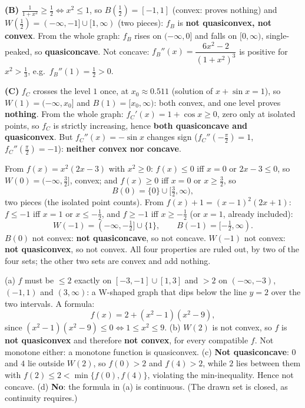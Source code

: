 \begin{solutions}
        \textbf{(B)} $\tfrac{1}{1+x^{2}}\ge\tfrac12\iff x^{2}\le1$, so
        $B(\tfrac12)=[-1,1]$ (convex: proves nothing) and
        $W(\tfrac12)=(-\infty,-1]\cup[1,\infty)$ (two pieces): $f_B$ is
        \textbf{not quasiconvex, not convex}. From the whole graph: $f_B$
        rises on $(-\infty,0]$ and falls on $[0,\infty)$, single-peaked,
        so \textbf{quasiconcave}. Not concave:
        $f_B''(x)=\dfrac{6x^{2}-2}{(1+x^{2})^{3}}$ is positive for
        $x^{2}>\tfrac13$, e.g.\ $f_B''(1)=\tfrac12>0$.

        \textbf{(C)} $f_C$ crosses the level $1$ once, at
        $x_0\approx0.511$ (solution of $x+\sin x=1$), so
        $W(1)=(-\infty,x_0]$ and $B(1)=[x_0,\infty)$: both convex, and one
        level proves \textbf{nothing}. From the whole graph:
        $f_C'(x)=1+\cos x\ge0$, zero only at isolated points, so $f_C$ is
        strictly increasing, hence \textbf{both quasiconcave and
        quasiconvex}. But $f_C''(x)=-\sin x$ changes sign
        ($f_C''(-\tfrac{\pi}{2})=1$, $f_C''(\tfrac{\pi}{2})=-1$):
        \textbf{neither convex nor concave}.

  \item From $f(x)=x^{2}(2x-3)$ with $x^{2}\ge0$: $f(x)\le0$ iff $x=0$ or
        $2x-3\le0$, so $W(0)=(-\infty,\tfrac32]$, convex; and $f(x)\ge0$
        iff $x=0$ or $x\ge\tfrac32$, so
        \[
          B(0)=\{0\}\cup[\tfrac32,\infty),
        \]
        two pieces (the isolated point counts). From
        $f(x)+1=(x-1)^{2}(2x+1)$: $f\le-1$ iff $x=1$ or $x\le-\tfrac12$,
        and $f\ge-1$ iff $x\ge-\tfrac12$ (or $x=1$, already included):
        \[
          W(-1)=(-\infty,-\tfrac12]\cup\{1\},\qquad
          B(-1)=[-\tfrac12,\infty).
        \]
        $B(0)$ not convex: \textbf{not quasiconcave}, so not concave.
        $W(-1)$ not convex: \textbf{not quasiconvex}, so not convex. All
        four properties are ruled out, by two of the four sets; the other
        two sets are convex and add nothing.

  \item (a) $f$ must be $\le2$ exactly on $[-3,-1]\cup[1,3]$ and $>2$ on
        $(-\infty,-3)$, $(-1,1)$ and $(3,\infty)$: a W-shaped graph that
        dips below the line $y=2$ over the two intervals. A formula:
        \[
          f(x)=2+(x^{2}-1)(x^{2}-9),
        \]
        since $(x^{2}-1)(x^{2}-9)\le0\iff1\le x^{2}\le9$.
        (b) $W(2)$ is not convex, so $f$ is \textbf{not quasiconvex} and
        therefore \textbf{not convex}, for every compatible $f$. Not
        monotone either: a monotone function is quasiconvex.
        (c) \textbf{Not quasiconcave}: $0$ and $4$ lie outside $W(2)$, so
        $f(0)>2$ and $f(4)>2$, while $2$ lies between them with
        $f(2)\le2<\min\{f(0),f(4)\}$, violating the min-inequality. Hence
        not concave. (d) \textbf{No}: the formula in (a) is continuous.
        (The drawn set is closed, as continuity requires.)


\end{solutions}
